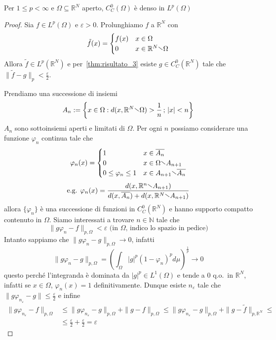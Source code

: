 \begin{theorem}[\(\overline{C_C^0(\Omega)} = L^p(\Omega)\) ]\label{thm:risultato_4}
    Per \(1 \le p < \infty\) e \(\Omega \subseteq \mathbb{R}^{N} \) aperto, 
    \(C_C^{0}{(\Omega)}\) è denso in \(L^p{(\Omega)}\)
\end{theorem}
\begin{proof}
    Sia \(f \in L^p(\Omega)\) e \(\varepsilon>0\). Prolunghiamo \(f\) a
    \(\mathbb{R}^{N}\) con 
    \[
        \tilde{f}{(x)} = \begin{cases}
            f{(x)} & x \in \Omega \\
            0 & x \in \mathbb{R}^{N} \sminus \Omega
        \end{cases}
    \]
    Allora \(\tilde{f} \in L^p(\mathbb{R}^{N})\) e per~\ref{thm:risultato_3}
    esiste \(g \in C_C^{0}{(\mathbb{R}^{N})}\) tale che \(\|\tilde{f} - g\|_p <
    \frac{\varepsilon}{2}\).

    Prendiamo una successione di insiemi 
    \[
        A_{n} := \left\{x \in \Omega: d{(x, \mathbb{R}^{N} \sminus \Omega)} >
        \frac{1}{n} \, ; \, |x| < n\right\} 
    \]
    \(A_{n}\) sono sottoinsiemi aperti e limitati di \(\Omega\). Per ogni \(n\)
    possiamo considerare una funzione \(\varphi_n\) continua tale che
    \[
        \varphi_n{(x)} = \begin{cases}
            1 & x \in \overline{A_{n}} \\
            0 & x \in \Omega \sminus A_{n+1} \\
            0 \le \varphi_n \le 1 & x \in A_{n+1} \sminus \overline{A_{n}}
        \end{cases} \]\[
        \text{e.g. }
        \varphi_n{(x)} = \frac{d(x, \mathbb{R}^{n} \sminus A_{n+1})}{d{(x,
        \overline{A_{n}}) + d{(x, \mathbb{R}^{N} \sminus A_{n+1})}}}
    \]
    allora \(\{\varphi _n\} \) è una successione di funzioni in
    \(C_C^{0}{(\mathbb{R}^{N})}\) e hanno supporto compatto contenuto in
    \(\Omega\). Siamo interessati a trovare \(n \in \mathbb{N}\) tale che
    \[
        \|g \varphi_n - f\|_{p, \Omega}  < \varepsilon \text{ (in \(\Omega\),
        indico lo spazio in pedice)}
    \]
    Intanto sappiamo che \(\|g \varphi _n - g\|_{p, \Omega} \to 0\), infatti
    \[
        \|g \varphi _n - g \|_{p, \Omega}  = {\left( \int_{\Omega} |g|^{p} {(1 -
    \varphi _n)}^{p} d\mu \right)}^{\frac{1}{p}} \to 0
    \]
    questo perché l'integranda è dominata da \(|g|^{p} \in L^1(\Omega)\)
    e tende a 0 q.o.~in \(\mathbb{R}^{N}\), infatti se \(x \in \Omega\),
    \(\varphi_n{(x)} = 1\) definitivamente. Dunque esiste \(n_\varepsilon\) tale
    che \(\|g \varphi_{n_\varepsilon} - g\| \le \frac{\varepsilon}{2}\) 
    e infine
    \begin{align*}
        \|g \varphi_{n_\varepsilon}  - f\|_{p, \Omega}  &\le   \|g \varphi
        _{n_\varepsilon}  - g\|_{p, \Omega}
        + \|g - f\|_{p, \Omega} \le \|g \varphi_{n_\varepsilon}  - g\|_{p, \Omega} + \|g -
        \tilde{f}\|_{p, \mathbb{R}^{N}} \le \\
        &\le \frac{\varepsilon}{2} + \frac{\varepsilon}{2} = \varepsilon
    \end{align*}
\end{proof}

